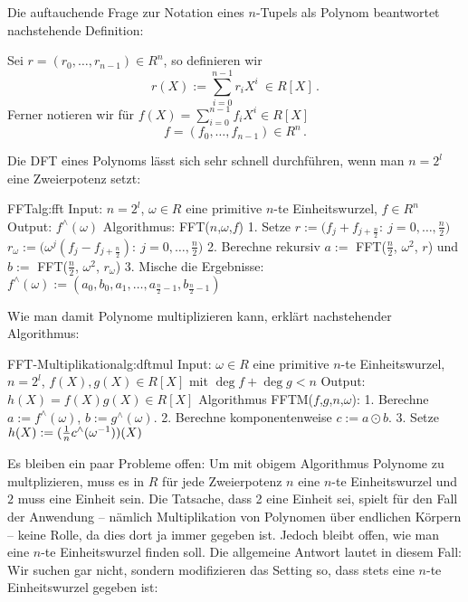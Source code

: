 Die auftauchende Frage zur Notation eines $n$-Tupels als Polynom beantwortet
nachstehende Definition:

\begin{definition}
  Sei $r = (r_0,\ldots,r_{n-1})\in R^n$, so definieren wir 
  \[ r(X) := \sum_{i=0}^{n-1} r_i X^i \ \in R[X] \,.\]
  Ferner notieren wir für 
  $f(X) = \sum_{i=0}^{n-1} f_i X^i \in R[X]$
  \[ f = (f_0,\ldots,f_{n-1}) \in R^n \,.\]
\end{definition}

Die DFT eines Polynoms lässt sich sehr schnell durchführen, wenn man
$n = 2^l$ eine Zweierpotenz setzt:
\begin{pseudocode}{FFT}{alg:fft}
Input: $n = 2^l$, $\omega \in R$ eine primitive $n$-te Einheitswurzel, $f \in R^n$
Output: $f^\wedge(\omega)$
Algorithmus: FFT($n$,$\omega$,$f$)
  1. Setze
    $r := \big(f_j + f_{j+\frac n 2}:\ j=0,\ldots,\tfrac n 2\big)$
    $r_\omega := \big( \omega^j (f_j - f_{j+\frac n 2}):\
         j=0,\ldots,\tfrac n 2\big)$
  2. Berechne rekursiv $a := $ FFT($\tfrac n 2$, $\omega^2$, $r$) und $b := $ FFT($\tfrac n 2$, $\omega^2$, $r_\omega$)
  3. Mische die Ergebnisse: $f^\wedge(\omega) := (a_0,b_0,a_1,\ldots,
      a_{\frac n 2 -1},b_{\frac n 2 -1})$
\end{pseudocode}

Wie man damit Polynome multiplizieren kann, erklärt nachstehender Algorithmus:
\begin{pseudocode}{FFT-Multiplikation}{alg:dftmul}
Input: $\omega \in R$ eine primitive $n$-te Einheitswurzel, $n = 2^l$,
       $f(X),g(X) \in R[X]$ mit $\deg f + \deg g < n$
Output: $h(X) = f(X)g(X) \in R[X]$
Algorithmus FFTM($f$,$g$,$n$,$\omega$):
  1. Berechne $a := f^\wedge(\omega)$, $b := g^\wedge(\omega)$.
  2. Berechne komponentenweise $c := a\odot b$.
  3. Setze $h(X) := (\tfrac 1 n c^\wedge(\omega^{-1}))(X)$
\end{pseudocode}


Es bleiben ein paar Probleme offen: Um mit obigem Algorithmus Polynome zu
multplizieren, muss es in $R$ für jede Zweierpotenz $n$ eine $n$-te
Einheitswurzel und $2$ muss eine Einheit sein. Die Tatsache, dass 2 eine
Einheit sei, spielt für den Fall der Anwendung -- nämlich Multiplikation von
Polynomen über endlichen Körpern -- keine Rolle, da dies dort ja immer gegeben
ist. Jedoch bleibt offen, wie man eine $n$-te Einheitswurzel finden soll.
Die allgemeine Antwort lautet in diesem Fall: Wir suchen gar nicht, sondern
modifizieren das Setting so, dass stets eine $n$-te Einheitswurzel gegeben
ist:

